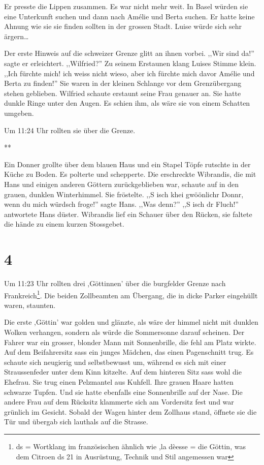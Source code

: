 \documentclass[11pt,titlepage,a5paper]{book}
\newcommand{\sterne}{\par{\centering ***\par}}
\newcommand{\am}{Amélie }
\begin{document}
Er presste die Lippen zusammen. Es war nicht mehr weit. In Basel würden sie eine Unterkunft suchen und dann nach \am und Berta suchen. Er hatte keine Ahnung wie sie sie finden sollten in der grossen Stadt. Luise würde sich sehr ärgern\dots 

Der erste Hinweis auf die schweizer Grenze glitt an ihnen vorbei. ,,Wir sind da!'' sagte er erleichtert. ,,Wilfried?'' Zu seinem Erstaunen klang Luises Stimme klein. ,,Ich fürchte mich! ich weiss nicht wieso, aber ich fürchte mich davor \am und Berta zu finden!'' Sie waren in der kleinen Schlange vor dem Grenzübergang stehen geblieben. Wilfried schaute erstaunt seine Frau genauer an. Sie hatte dunkle Ringe unter den Augen. Es schien ihm, als wäre sie von einem Schatten umgeben.

Um 11:24 Uhr rollten sie über die Grenze.

\sterne

Ein Donner grollte über dem blauen Haus und ein Stapel Töpfe rutschte in der Küche zu Boden. Es polterte und schepperte. Die erschreckte Wibrandis, die mit Hans und einigen anderen Göttern zurückgeblieben war, schaute auf in den grauen, dunklen Winterhimmel. Sie fröstelte. ,,S isch khei gwöönlichr Donnr, wenn du mich würdsch froge!'' sagte Hans. ,,Was denn?'' ,,S isch dr Fluch!'' antwortete Hans düster. Wibrandis lief ein Schauer über den Rücken, sie faltete die hände zu einem kurzen Stossgebet.

\section*{4}

Um 11:23 Uhr rollten drei ,Göttinnen' über die burgfelder Grenze nach Frankreich\footnote{ds = Wortklang im französischen ähnlich wie ,la dèesse = die Göttin, was dem Citroen ds 21 in Ausrüstung, Technik und Stil angemessen war}. Die beiden Zollbeamten am Übergang, die in dicke Parker eingehüllt waren, staunten.

 Die erste ,Göttin' war golden und glänzte, als wäre der himmel nicht mit dunklen Wolken verhangen, sondern als würde die Sommersonne darauf scheinen. Der Fahrer war ein grosser, blonder Mann mit Sonnenbrille, die fehl am Platz wirkte. Auf dem Beifahrersitz sass ein junges Mädchen, das einen Pagenschnitt trug. Es schaute sich neugierig und selbstbewusst um, während es sich mit einer Straussenfeder unter dem Kinn kitzelte.  Auf dem hinteren Sitz sass wohl die Ehefrau. Sie trug einen Pelzmantel aus Kuhfell. Ihre grauen Haare hatten schwarze Tupfen. Und sie hatte ebenfalls eine Sonnenbrille auf der Nase. Die andere Frau auf dem Rücksitz klammerte sich am Vordersitz fest und war grünlich im Gesicht. Sobald der Wagen hinter dem Zollhaus stand, öffnete sie die Tür und übergab sich lauthals auf die Strasse. 
 
\end{document}
